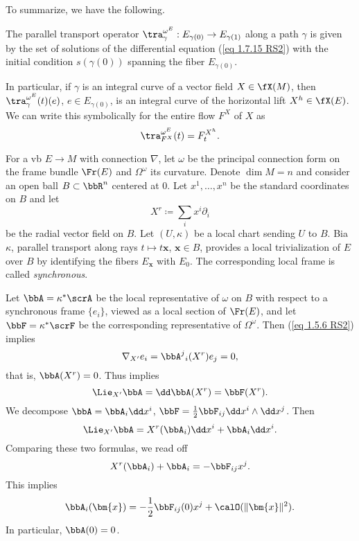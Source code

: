 To summarize, we have the following.
\begin{prop}
    The parallel transport operator $\tra_\gamma^{\omega^E}:E_{\gamma(0)}\to E_{\gamma(1)}$ along a path $\gamma$ is given by the set of solutions of the differential equation (\ref{eq 1.7.15 RS2}) with the initial condition $s(\gamma(0))$ spanning the fiber $E_{\gamma(0)}$.
\end{prop}

\begin{rem}
    In particular, if $\gamma$ is an integral curve of a vector field $X\in\fX(M)$, then $\tra_\gamma^{\omega^E}(t)(e)$, $e\in E_{\gamma(0)}$, is an integral curve of the horizontal lift $X^h\in\fX(E)$. We can write this symbolically for the entire flow $F^X$ of $X$ as 
    \[\tra^{\omega^E}_{F^X}(t)=F_t^{X^h}.\]
\end{rem}

\begin{rem}\label{rem 1.7.19 RS2}
    For a \gls{vb} $E\to M$ with connection $\nabla$, let $\omega$  be the principal connection form on the frame bundle $\Fr(E)$ and $\Omega^\omega$ its curvature. Denote $\dim M=n$ and consider an open ball $B\subset \bbR^n$ centered at $0$. Let $x^1,\ldots,x^n$ be the standard coordinates on $B$ and let
    \[X^r\coloneqq \sum_i x^i\partial_i\]
    be the radial vector field on $B$. Let $(U,\kappa)$ be a local chart sending $U$ to $B$. Bia $\kappa$, parallel transport along rays $t\mapsto t\bm{x}$, $\bm{x}\in B$, provides a local trivialization of $E$ over $B$ by identifying the fibers $E_{\bm{x}}$ with $E_0$. The corresponding local frame is called \emph{synchronous}.

    Let $\bbA=\kappa^\ast\scrA$ be the local representative of $\omega$ on $B$ with respect to a synchronous frame $\{e_i\}$, viewed as a local section of $\Fr(E)$, and let $\bbF=\kappa^\ast \scrF$ be the corresponding representative of  $\Omega^\omega$. Then (\ref{eq 1.5.6 RS2}) implies 
    \[\nabla_{X'}e_i=\bbA^j{}_i(X^r)e_j=0,\]
    that is, $\bbA(X^r)=0$. Thus implies
    \[\Lie_{X'}\bbA=\dd\bbA(X^r)=\bbF(X^r).\]
    We decompose $\bbA=\bbA_i\dd x^i$, $\bbF=\frac12 \bbF_{ij}\dd x^i\wedge \dd x^j$. Then
    \[\Lie_{X'}\bbA=X^r(\bbA_i)\dd x^i+\bbA_i\dd x^i.\]
    Comparing these two formulas, we read off
    \[X^r(\bbA_i)+\bbA_i=-\bbF_{ij}x^j.\]
    This implies
    \[\bbA_i(\bm{x})=-\frac12\bbF_{ij}(0)x^j+\calO(\lVert\bm{x}\rVert^2).\]
    In particular, $\bbA(0)=0$. 
\end{rem}








